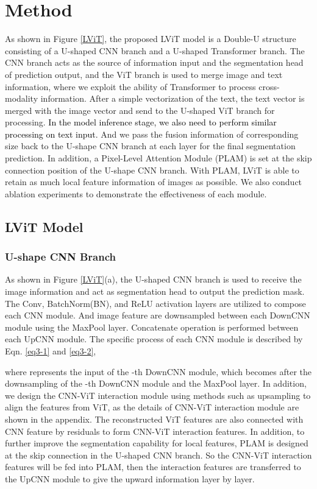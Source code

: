 \documentclass[lettersize,journal]{IEEEtran}
\begin{document}
\section{Method}
\label{others}
As shown in Figure \ref{LViT}, the proposed LViT model is a Double-U structure consisting of a U-shaped CNN branch and a U-shaped Transformer branch.
The CNN branch acts as the source of information input and the segmentation head of prediction output, and the ViT branch is used to merge image and text information, where we exploit the ability of Transformer to process cross-modality information. After a simple vectorization of the text, the text vector is merged with the image vector and send to the U-shaped ViT branch for processing. \textcolor{black}{In the model inference stage, we also need to perform similar processing on text input.} And we pass the fusion information of corresponding size back to the U-shape CNN branch at each layer for the final segmentation prediction. In addition, a Pixel-Level Attention Module (PLAM) is set at the skip connection position of the U-shape CNN branch. With PLAM, LViT is able to retain as much local feature information of images as possible. We also conduct ablation experiments to demonstrate the effectiveness of each module.

\subsection{LViT Model}
\subsubsection{U-shape CNN Branch}
As shown in Figure \ref{LViT}(a), the U-shaped CNN branch is used to receive the image information and act as segmentation head to output the prediction mask. The Conv, BatchNorm(BN), and ReLU activation layers are utilized to compose each CNN module. And image feature are downsampled between each DownCNN module using the MaxPool layer. Concatenate operation is performed between each UpCNN module. The specific process of each CNN module is described by Eqn. \ref{eq3-1} and \ref{eq3-2},

where  represents the input of the -th DownCNN module, which becomes  after the downsampling of the -th DownCNN module and the MaxPool layer. In addition, we design the CNN-ViT interaction module using methods such as upsampling to align the features from ViT, as the details of CNN-ViT interaction module are shown in the appendix. The reconstructed ViT features are also connected with CNN feature by residuals to form CNN-ViT interaction features. In addition, to further improve the segmentation capability for local features, PLAM is designed at the skip connection in the U-shaped CNN branch. So the CNN-ViT interaction features will be fed into PLAM, then the interaction features are transferred to the UpCNN module to give the upward information layer by layer.
\end{document}
